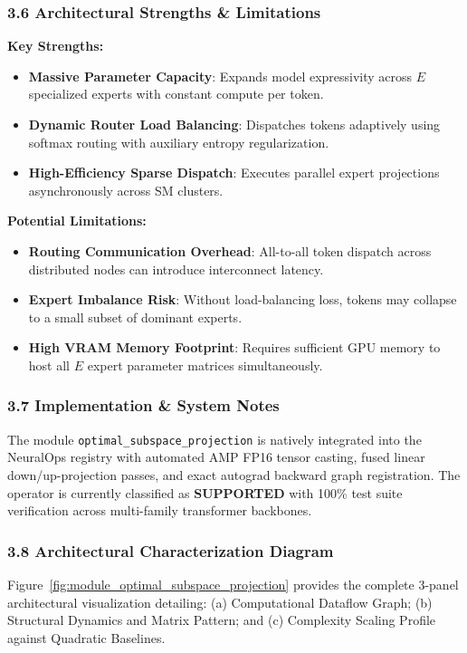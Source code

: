 \subsubsection*{3.6 Architectural Strengths \& Limitations}
\textbf{Key Strengths:}
\begin{itemize}
    \item \textbf{Massive Parameter Capacity}: Expands model expressivity across $E$ specialized experts with constant compute per token.
    \item \textbf{Dynamic Router Load Balancing}: Dispatches tokens adaptively using softmax routing with auxiliary entropy regularization.
    \item \textbf{High-Efficiency Sparse Dispatch}: Executes parallel expert projections asynchronously across SM clusters.
\end{itemize}

\textbf{Potential Limitations:}
\begin{itemize}
    \item \textbf{Routing Communication Overhead}: All-to-all token dispatch across distributed nodes can introduce interconnect latency.
    \item \textbf{Expert Imbalance Risk}: Without load-balancing loss, tokens may collapse to a small subset of dominant experts.
    \item \textbf{High VRAM Memory Footprint}: Requires sufficient GPU memory to host all $E$ expert parameter matrices simultaneously.
\end{itemize}

\subsubsection*{3.7 Implementation \& System Notes}
The module \texttt{optimal\_subspace\_projection} is natively integrated into the NeuralOps registry with automated AMP FP16 tensor casting, fused linear down/up-projection passes, and exact autograd backward graph registration. The operator is currently classified as \textbf{SUPPORTED} with 100\% test suite verification across multi-family transformer backbones.

\subsubsection*{3.8 Architectural Characterization Diagram}
Figure~\ref{fig:module_optimal_subspace_projection} provides the complete 3-panel architectural visualization detailing: (a) Computational Dataflow Graph; (b) Structural Dynamics and Matrix Pattern; and (c) Complexity Scaling Profile against Quadratic Baselines.

